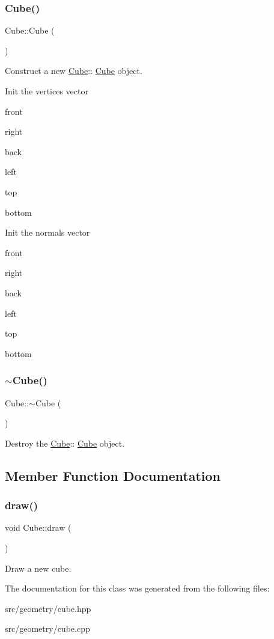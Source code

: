 \subsubsection{\texorpdfstring{Cube()}{Cube()}}
{\footnotesize\ttfamily Cube\+::\+Cube (\begin{DoxyParamCaption}{ }\end{DoxyParamCaption})}



Construct a new \mbox{\hyperlink{classCube}{Cube}}\+:\+: \mbox{\hyperlink{classCube}{Cube}} object. 

Init the vertices vector

front

right

back

left

top

bottom

Init the normals vector

front

right

back

left

top

bottom \mbox{\label{classCube_aa814e979cecb8c451fdb332ded2cea1e}} 
\subsubsection{\texorpdfstring{$\sim$Cube()}{~Cube()}}
{\footnotesize\ttfamily Cube\+::$\sim$\+Cube (\begin{DoxyParamCaption}{ }\end{DoxyParamCaption})}



Destroy the \mbox{\hyperlink{classCube}{Cube}}\+:\+: \mbox{\hyperlink{classCube}{Cube}} object. 



\subsection{Member Function Documentation}
\mbox{\label{classCube_ab26b72a81376fd5dc4fcc7f0b715b087}} 
\subsubsection{\texorpdfstring{draw()}{draw()}}
{\footnotesize\ttfamily void Cube\+::draw (\begin{DoxyParamCaption}{ }\end{DoxyParamCaption})\hspace{0.3cm}{\ttfamily [protected]}}



Draw a new cube. 



The documentation for this class was generated from the following files\+:\begin{DoxyCompactItemize}
\item 
src/geometry/cube.\+hpp\item 
src/geometry/cube.\+cpp\end{DoxyCompactItemize}
